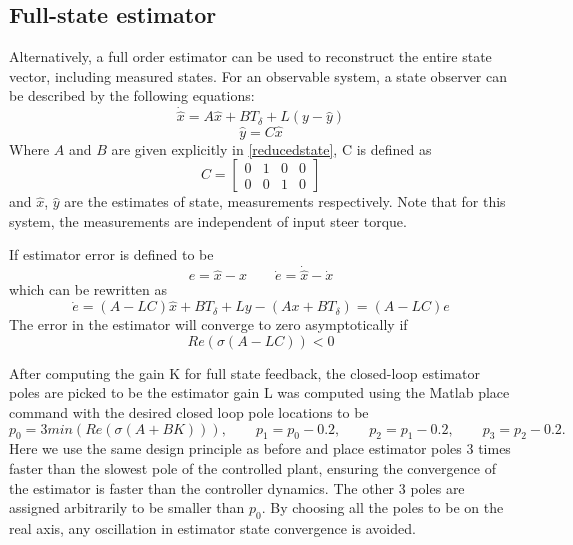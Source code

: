 \documentclass[letterpaper,11pt]{article}
\begin{document}
\subsection{Full-state estimator} \label{fullstate}
Alternatively, a full order estimator can be used to reconstruct the entire
state vector, including measured states. For an observable system, a state
observer can be described by the following equations:
\begin{equation*}
\dot{\hat{x}} = A \hat{x} + B T_\delta + L \left(y - \hat{y}\right)
\end{equation*}
\begin{equation*}
\hat{y} = C \hat{x}
\end{equation*}
Where $A$ and $B$ are given explicitly in \autoref{reducedstate}, C is defined as
\begin{equation*}
C = \left[\begin{smallmatrix}0 & 1 & 0 & 0\\0 & 0 & 1 & 0\end{smallmatrix}\right]
\end{equation*}
and $\hat{x}$, $\hat{y}$ are the estimates of state, measurements respectively.
Note that for this system, the measurements are independent of input steer
torque.

If estimator error is defined to be
\begin{equation*}
e = \hat{x} - x
\qquad
\dot{e} = \dot{\hat{x}} - \dot{x}
\end{equation*}
which can be rewritten as
\begin{equation*}
\dot{e} = \left(A - LC\right) \hat{x} + B T_\delta + L y - \left(A x + B T_\delta\right)
= \left(A - LC\right) e
\end{equation*}
The error in the estimator will converge to zero asymptotically if
\begin{equation*}
Re\left(\sigma\left(A - LC\right)\right) < 0
\end{equation*}

After computing the gain K for full state feedback, the closed-loop estimator poles are picked to be
the estimator gain L was computed using the Matlab place command with the
desired closed loop pole locations to be
\begin{equation*}
p_0 = 3 min\left(Re\left(\sigma\left(A + BK\right)\right)\right),
\qquad
p_1 = p_0 - 0.2,
\qquad
p_2 = p_1 - 0.2,
\qquad
p_3 = p_2 - 0.2.
\end{equation*}
Here we use the same design principle as before and place estimator poles 3
times faster than the slowest pole of the controlled plant, ensuring the
convergence of the estimator is faster than the controller dynamics. The other
3 poles are assigned arbitrarily to be smaller than $p_0$.  By choosing all the
poles to be on the real axis, any oscillation in estimator state convergence is
avoided.
\end{document}
